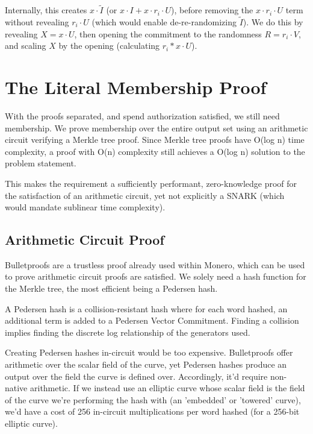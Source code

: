 \documentclass[]{article}
\begin{document}
Internally, this creates $x \cdot \tilde{I}$ (or $x \cdot I + x \cdot r_i \cdot U$), before removing the $x \cdot r_i \cdot U$ term without revealing $r_i \cdot U$ (which would enable de-re-randomizing $\tilde{I}$). We do this by revealing $X = x \cdot U$, then opening the commitment to the randomness $R = r_i \cdot V$, and scaling $X$ by the opening (calculating $r_i * x \cdot U$).

\newpage

\section{The Literal Membership Proof}

With the proofs separated, and spend authorization satisfied, we still need membership. We prove membership over the entire output set using an arithmetic circuit verifying a Merkle tree proof. Since Merkle tree proofs have O(log n) time complexity, a proof with O(n) complexity still achieves a O(log n) solution to the problem statement.

This makes the requirement a sufficiently performant, zero-knowledge proof for the satisfaction of an arithmetic circuit, yet not explicitly a SNARK (which would mandate sublinear time complexity).

\subsection{Arithmetic Circuit Proof}

Bulletproofs are a trustless proof already used within Monero, which can be used to prove arithmetic circuit proofs are satisfied. We solely need a hash function for the Merkle tree, the most efficient being a Pedersen hash.

A Pedersen hash is a collision-resistant hash where for each word hashed, an additional term is added to a Pedersen Vector Commitment. Finding a collision implies finding the discrete log relationship of the generators used.

Creating Pedersen hashes in-circuit would be too expensive. Bulletproofs offer arithmetic over the scalar field of the curve, yet Pedersen hashes produce an output over the field the curve is defined over. Accordingly, it'd require non-native arithmetic. If we instead use an elliptic curve whose scalar field is the field of the curve we're performing the hash with (an 'embedded' or 'towered' curve), we'd have a cost of 256 in-circuit multiplications per word hashed (for a 256-bit elliptic curve).
\end{document}

